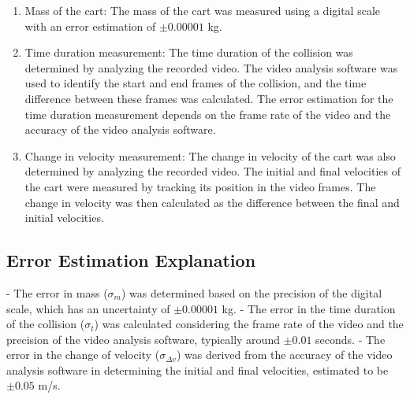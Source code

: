 \documentclass[12pt]{article}
\begin{document}
\begin{enumerate}
    \item Mass of the cart: The mass of the cart was measured using a digital scale with an error estimation of $\pm 0.00001$ kg.
    \item Time duration measurement: The time duration of the collision was determined by analyzing the recorded video. The video analysis software was used to identify the start and end frames of the collision, and the time difference between these frames was calculated. The error estimation for the time duration measurement depends on the frame rate of the video and the accuracy of the video analysis software.
    \item Change in velocity measurement: The change in velocity of the cart was also determined by analyzing the recorded video. The initial and final velocities of the cart were measured by tracking its position in the video frames. The change in velocity was then calculated as the difference between the final and initial velocities.
\end{enumerate}

\subsection*{Error Estimation Explanation}

- The error in mass ($\sigma_m$) was determined based on the precision of the digital scale, which has an uncertainty of $\pm 0.00001$ kg.
- The error in the time duration of the collision ($\sigma_t$) was calculated considering the frame rate of the video and the precision of the video analysis software, typically around $\pm 0.01$ seconds.
- The error in the change of velocity ($\sigma_{\Delta v}$) was derived from the accuracy of the video analysis software in determining the initial and final velocities, estimated to be $\pm 0.05$ m/s.

\end{document}
